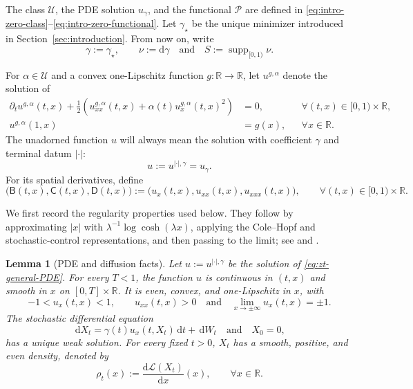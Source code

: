 \documentclass[10pt]{amsart}
\newtheorem{lemma}[lemma]{Lemma}
\theoremstyle{definition}
\theoremstyle{remark}
\numberwithin{equation}{section}
\newcommand{\R}{\mathbb R}
\newcommand{\1}{\mathbf 1}
\newcommand{\supp}{\operatorname{supp}}
\newcommand{\cU}{\mathcal U}
\newcommand{\cP}{\mathcal P}
\newcommand{\dd}{\,\mathrm d}
\begin{document}
The class $\cU$, the PDE solution $u_\gamma$, and the functional $\cP$ are defined in \eqref{eq:intro-zero-class}--\eqref{eq:intro-zero-functional}. Let $\gamma_\star$ be the unique minimizer introduced in Section~\ref{sec:introduction}. From now on, write
\begin{equation}
 \gamma:=\gamma_\star,\qquad \nu:=\mathrm d\gamma
 \quad\text{and}\quad S:=\supp_{[0,1)}\nu.
 \label{eq:zt-minimizer-notation}
\end{equation}

For $\alpha\in\cU$ and a convex one-Lipschitz function $g:\R\to\R$, let $u^{g,\alpha}$ denote the solution of
\begin{equation}
 \begin{aligned}
 \partial_tu^{g,\alpha}(t,x)+\frac12\left(u_{xx}^{g,\alpha}(t,x)+\alpha(t)u_x^{g,\alpha}(t,x)^2\right)&=0,\qquad &&\forall (t,x)\in[0,1)\times\R,\\
 u^{g,\alpha}(1,x)&=g(x), &&\forall x\in\R.
 \end{aligned}
 \label{eq:zt-general-PDE}
\end{equation}
The unadorned function $u$ will always mean the solution with coefficient $\gamma$ and terminal datum $|\cdot|$:
\begin{equation*}
 u:=u^{|\cdot|,\gamma}=u_\gamma.
\end{equation*}
For its spatial derivatives, define
\begin{equation}
 \bigl(\mathsf B(t,x),\mathsf C(t,x),\mathsf D(t,x)\bigr)
 :=\bigl(u_x(t,x),u_{xx}(t,x),u_{xxx}(t,x)\bigr),
 \qquad \forall (t,x)\in[0,1)\times\R.
 \label{eq:zt-BCD-shorthand}
\end{equation}

We first record the regularity properties used below. They follow by approximating $|x|$ with $\lambda^{-1}\log\cosh(\lambda x)$, applying the Cole--Hopf and stochastic-control representations, and then passing to the limit; see \cite[Proposition 2 and Theorem 5]{ChenHandschyLerman} and \cite[Propositions 2 and 3]{AuffingerChenZeng}.

\begin{lemma}[PDE and diffusion facts]
\label{lem:zt-PDE-facts}
Let $u:=u^{|\cdot|,\gamma}$ be the solution of \eqref{eq:zt-general-PDE}. For every $T<1$, the function $u$ is continuous in $(t,x)$ and smooth in $x$ on $[0,T]\times\R$.  It is even, convex, and one-Lipschitz in $x$, with
\begin{equation*}
 -1<u_x(t,x)<1,\qquad u_{xx}(t,x)>0
 \quad\text{and}\quad \lim_{x\to\pm\infty}u_x(t,x)=\pm1.
\end{equation*}
The stochastic differential equation
\begin{equation}
 \dd X_t=\gamma(t)u_x(t,X_t)\dd t+\dd W_t
 \quad\text{and}\quad X_0=0,
 \label{eq:zt-optimal-SDE}
\end{equation}
has a unique weak solution. For every fixed $t>0$, $X_t$ has a smooth, positive, and even density, denoted by
\begin{equation}
 \rho_t(x):=\frac{\mathrm d\mathcal L(X_t)}{\mathrm d x}(x),
 \qquad \forall x\in\R.
 \label{eq:zt-rho-density}
\end{equation}
\end{lemma}
\end{document}
